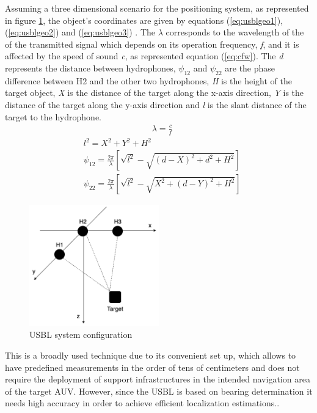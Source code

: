 Assuming a three dimensional scenario for the positioning system, as represented in figure \ref{fig:usblgeo}, the object's coordinates are given by equations (\ref{eq:usblgeo1}), (\ref{eq:usblgeo2}) and (\ref{eq:usblgeo3}) \cite{usbl-new}. The $\lambda$ corresponds to the wavelength of the of the transmitted signal which depends on its operation frequency, \textit{f}, and it is affected by the speed of sound \textit{c}, as represented equation (\ref{eq:cfw}).
The \textit{d} represents the distance between hydrophones, $\psi_{12}$ and $\psi_{22}$ are the phase difference between H2 and the other two hydrophones, \textit{H} is the height of the target object, \textit{X} is the distance of the target along the x-axis direction, \textit{Y} is the distance of the target along the y-axis direction and \textit{l} is the slant distance of the target to the hydrophone.
\begin{eqnarray}
& \lambda = \frac{c}{f}
\label{eq:cfw}
\end{eqnarray}
\begin{eqnarray}
& l^2 = X^2 + Y^2 + H^2 
\label{eq:usblgeo1}\\
& \psi_{12} = \frac{2\pi}{\lambda}[\sqrt{l^2} - \sqrt{(d-X)^2 + d^2 + H^2}]
\label{eq:usblgeo2}\\
& \psi_{22} = \frac{2\pi}{\lambda}[\sqrt{l^2} - \sqrt{X^2 + (d-Y)^2 + H^2}]
\label{eq:usblgeo3}
\end{eqnarray}

\begin{figure}[!htbp]
	\centering
	\includegraphics[width=0.5\textwidth]{figures/usbl-config}
	\caption{USBL system configuration}
	\label{fig:usblgeo}
\end{figure}

This is a broadly used technique due to its convenient set up, which allows to have predefined measurements in the order of tens of centimeters and does not require the deployment of support infrastructures in the intended navigation area of the target AUV. However, since the USBL is based on bearing determination it needs high accuracy in order to achieve efficient localization estimations.. 


